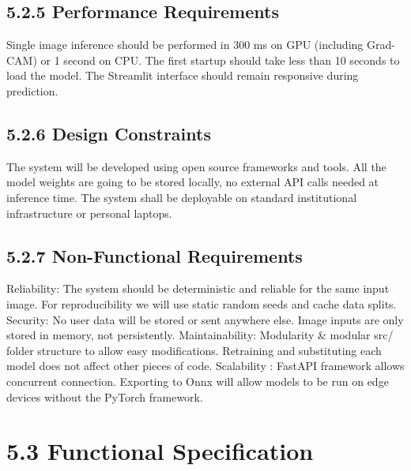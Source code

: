 \documentclass[12pt,a4paper,oneside]{report}
\begin{document}
\subsection{5.2.5 Performance Requirements}
Single image inference should be performed in 300 ms on GPU (including Grad-CAM) or 1 second on CPU.
The first startup should take less than 10 seconds to load the model.
The Streamlit interface should remain responsive during prediction.
\subsection{5.2.6 Design Constraints}
The system will be developed using open source frameworks and tools.
All the model weights are going to be stored locally, no external API calls needed at inference time.
The system shall be deployable on standard institutional infrastructure or personal laptops.
\subsection{5.2.7 Non-Functional Requirements}
Reliability: The system should be deterministic and reliable for the same input image. For reproducibility we will use static random seeds and cache data splits.
Security: No user data will be stored or sent anywhere else. Image inputs are only stored in memory, not persistently.
Maintainability: Modularity \& modular src/ folder structure to allow easy modifications. Retraining and substituting each model does not affect other pieces of code.
Scalability : FastAPI framework allows concurrent connection. Exporting to Onnx will allow models to be run on edge devices without the PyTorch framework.
\section{5.3 Functional Specification}
\end{document}
